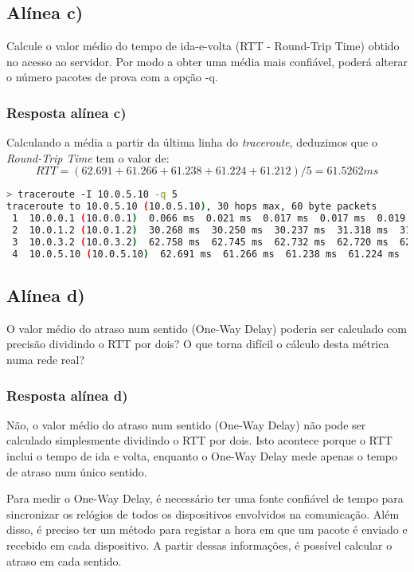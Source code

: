 \documentclass{article}
\begin{document}
\pagebreak

\subsection{Alínea c)}
Calcule o valor médio do tempo de ida-e-volta (RTT - Round-Trip Time) obtido no acesso ao servidor. Por modo
a obter uma média mais confiável, poderá alterar o número pacotes de prova com a opção -q.

\subsubsection{Resposta alínea c)}

Calculando a média a partir da última linha do \emph{traceroute}, deduzimos que o \emph{Round-Trip Time} tem o valor de:
\[ RTT = (62.691 + 61.266 + 61.238 + 61.224 + 61.212) / 5 = 61.5262 ms \]

\begin{lstlisting}[language=Bash]
> traceroute -I 10.0.5.10 -q 5                                             
traceroute to 10.0.5.10 (10.0.5.10), 30 hops max, 60 byte packets
 1  10.0.0.1 (10.0.0.1)  0.066 ms  0.021 ms  0.017 ms  0.017 ms  0.019 ms
 2  10.0.1.2 (10.0.1.2)  30.268 ms  30.250 ms  30.237 ms  31.318 ms  31.306 ms
 3  10.0.3.2 (10.0.3.2)  62.758 ms  62.745 ms  62.732 ms  62.720 ms  62.707 ms
 4  10.0.5.10 (10.0.5.10)  62.691 ms  61.266 ms  61.238 ms  61.224 ms  61.212 ms
\end{lstlisting}

\subsection{Alínea d)}

O valor médio do atraso num sentido (One-Way Delay) poderia ser calculado com precisão dividindo o RTT por
dois? O que torna difícil o cálculo desta métrica numa rede real?

\subsubsection{Resposta alínea d)}

Não, o valor médio do atraso num sentido (One-Way Delay) não pode ser calculado simplesmente dividindo o RTT por dois. Isto acontece porque o RTT inclui o tempo de ida e volta, enquanto o One-Way Delay mede apenas o tempo de atraso num único sentido.

Para medir o One-Way Delay, é necessário ter uma fonte confiável de tempo para sincronizar os relógios de todos os dispositivos envolvidos na comunicação. Além disso, é preciso ter um método para registar a hora em que um pacote é enviado e recebido em cada dispositivo. A partir dessas informações, é possível calcular o atraso em cada sentido.
\end{document}
